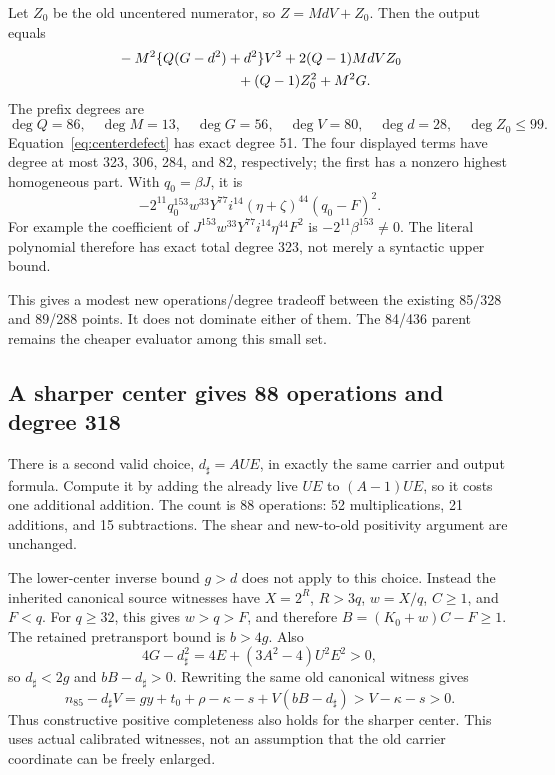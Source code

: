 \documentclass[11pt,letterpaper]{article}
\theoremstyle{definition}\newtheorem{definition}[theorem]{Definition}
\theoremstyle{remark}\newtheorem{remark}[theorem]{Remark}
\begin{document}
Let \(Z_0\) be the old uncentered numerator, so \(Z=MdV+Z_0\). Then
the output equals
\begin{align*}
 &-M^2\{Q(G-d^2)+d^2\}V^2
   +2(Q-1)MdVZ_0\\
 &\hspace{30mm}+(Q-1)Z_0^2+M^2G.
\end{align*}
The prefix degrees are
\[
 \deg Q=86,\quad\deg M=13,\quad\deg G=56,\quad
 \deg V=80,\quad\deg d=28,\quad\deg Z_0\le99.
\]
Equation~\eqref{eq:centerdefect} has exact degree 51. The four displayed
terms have degree at most 323, 306, 284, and 82, respectively; the first
has a nonzero highest homogeneous part. With \(q_0=\beta J\), it is
\[
 -2^{11}q_0^{153}w^{33}Y^{77}i^{14}
           (\eta+\zeta)^{44}(q_0-F)^2.
\]
For example the coefficient of
\(J^{153}w^{33}Y^{77}i^{14}\eta^{44}F^2\) is
\(-2^{11}\beta^{153}\ne0\). The literal polynomial therefore has
exact total degree 323, not merely a syntactic upper bound.

This gives a modest new operations/degree tradeoff between the existing
85/328 and 89/288 points. It does not dominate either of them. The
84/436 parent remains the cheaper evaluator among this small set.

\subsection{A sharper center gives 88 operations and degree 318}

There is a second valid choice, \(d_\sharp=AUE\), in exactly the same
carrier and output formula. Compute it by adding the already live
\(UE\) to \((A-1)UE\), so it costs one additional addition. The count
is 88 operations: 52 multiplications, 21 additions, and 15 subtractions.
The shear and new-to-old positivity argument are unchanged.

The lower-center inverse bound \(g>d\) does not apply to this choice.
Instead the inherited canonical source witnesses have
\(X=2^R\), \(R>3q\), \(w=X/q\), \(C\ge1\), and \(F<q\).
For \(q\ge32\), this gives \(w>q>F\), and therefore
\(B=(K_0+w)C-F\ge1\). The retained pretransport bound is \(b>4g\).
Also
\[
 4G-d_\sharp^2=4E+(3A^2-4)U^2E^2>0,
\]
so \(d_\sharp<2g\) and \(bB-d_\sharp>0\). Rewriting the same old
canonical witness gives
\[
 n_{85}-d_\sharp V
   =gy+t_0+\rho-\kappa-s+V(bB-d_\sharp)
   >V-\kappa-s>0.
\]
Thus constructive positive completeness also holds for the sharper
center. This uses actual calibrated witnesses, not an assumption that
the old carrier coordinate can be freely enlarged.
\end{document}
